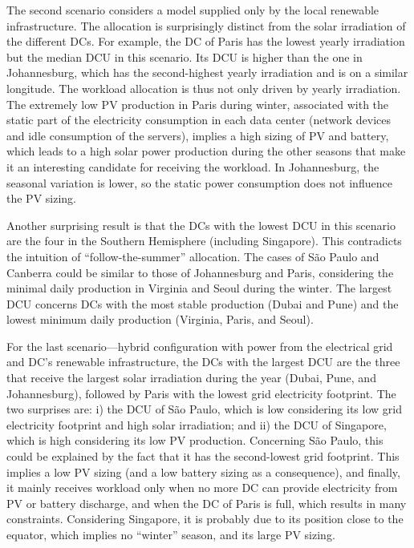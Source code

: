 The second scenario considers a model supplied only by the local renewable infrastructure. The allocation is surprisingly distinct from the solar irradiation of the different DCs. For example, the DC of Paris has the lowest yearly irradiation but the median DCU in this scenario. Its DCU is higher than the one in Johannesburg, which has the second-highest yearly irradiation and is on a similar longitude. The workload allocation is thus not only driven by yearly irradiation. The extremely low PV production in Paris during winter, associated with the static part of the electricity consumption in each data center (network devices and idle consumption of the servers), implies a high sizing of PV and battery, which leads to a high solar power production during the other seasons that make it an interesting candidate for receiving the workload. In Johannesburg, the seasonal variation is lower, so the static power consumption does not influence the PV sizing.


Another surprising result is that the DCs with the lowest DCU in this scenario are the four in the Southern Hemisphere (including Singapore). This contradicts the intuition of ``follow-the-summer'' allocation. The cases of S\~ao Paulo and Canberra could be similar to those of Johannesburg and Paris, considering the minimal daily production in Virginia and Seoul during the winter. The largest DCU concerns DCs with the most stable production (Dubai and Pune) and the lowest minimum daily production (Virginia, Paris, and Seoul). 


For the last scenario---hybrid configuration with power from the electrical grid and DC's renewable infrastructure, the DCs with the largest DCU are the three that receive the largest solar irradiation during the year (Dubai, Pune, and Johannesburg), followed by Paris with the lowest grid electricity footprint. The two surprises are: i) the DCU of S\~ao Paulo, which is low considering its low grid electricity footprint and high solar irradiation; and ii) the DCU of Singapore, which is high considering its low PV production. Concerning S\~ao Paulo, this could be explained by the fact that it has the second-lowest grid footprint. This implies a low PV sizing (and a low battery sizing as a consequence), and finally, it mainly receives workload only when no more DC can provide electricity from PV or battery discharge, and when the DC of Paris is full, which results in many constraints. Considering Singapore, it is probably due to its position close to the equator, which implies no ``winter'' season, and its large PV sizing. 

